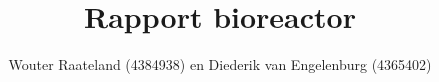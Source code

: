 \documentclass[a4paper,11pt]{report}
\title{Rapport bioreactor}
\author{Wouter Raateland (4384938) en Diederik van Engelenburg (4365402)}
\begin{document}
\maketitle

\newpage




\tableofcontents{}
\newpage














\end{document}

